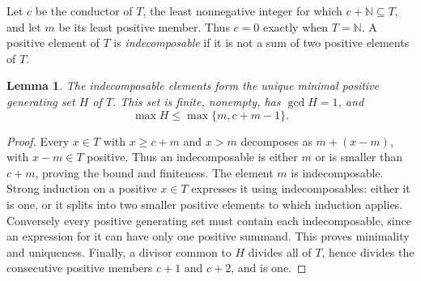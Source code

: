 \documentclass[11pt]{article}
\newtheorem{lemma}[theorem]{Lemma}
\newcommand{\N}{\mathbb N}
\begin{document}
Let $c$ be the conductor of $T$, the least nonnegative integer for which
$c+\N\subseteq T$, and let $m$ be its least positive member.
Thus $c=0$ exactly when $T=\N$.
A positive element of $T$ is \emph{indecomposable} if it is not a sum of
two positive elements of $T$.

\begin{lemma}\label{lem:generators}
The indecomposable elements form the unique minimal positive generating
set $H$ of $T$. This set is finite, nonempty, has $\gcd H=1$, and
\[
 \max H\le\max\{m,c+m-1\}.
\]
\end{lemma}
\begin{proof}
Every $x\in T$ with $x\ge c+m$ and $x>m$ decomposes as
$m+(x-m)$, with $x-m\in T$ positive. Thus an indecomposable is either
$m$ or is smaller than $c+m$, proving the bound and finiteness.
The element $m$ is indecomposable. Strong induction on a positive
$x\in T$ expresses it using indecomposables: either it is one, or it
splits into two smaller positive elements to which induction applies.
Conversely every positive generating set must contain each indecomposable,
since an expression for it can have only one positive summand.
This proves minimality and uniqueness.
Finally, a divisor common to $H$ divides all of $T$, hence divides the
consecutive positive members $c+1$ and $c+2$, and is one.
\end{proof}
\end{document}
